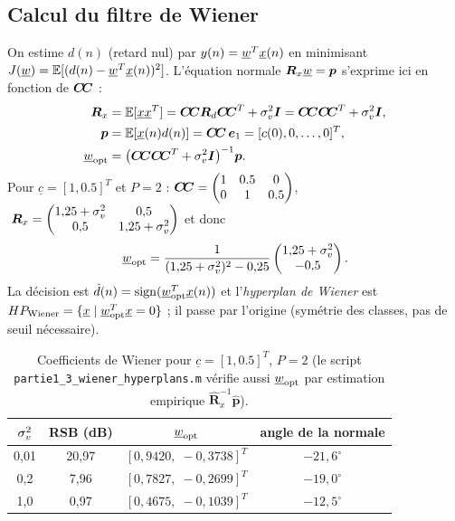 \subsection{Calcul du filtre de Wiener}
On estime $d(n)$ (retard nul) par $y(n)=\underline{w}^T\underline{x}(n)$ en minimisant $J(\underline{w})=\mathbb{E}[(d(n)-\underline{w}^T\underline{x}(n))^2]$. L'équation normale $\boldsymbol{R}_{x}\underline{w}=\boldsymbol{p}$ s'exprime ici en fonction de $\boldsymbol{C\!C}$ :
\begin{align}
 \boldsymbol{R}_{x}&=\mathbb{E}[\underline{x}\underline{x}^T]=\boldsymbol{C\!C}\boldsymbol{R}_d\boldsymbol{C\!C}^T+\sigma_v^2\boldsymbol{I}=\boldsymbol{C\!C}\boldsymbol{C\!C}^T+\sigma_v^2\boldsymbol{I},\\
 \boldsymbol{p}&=\mathbb{E}[\underline{x}(n)d(n)]=\boldsymbol{C\!C}\,\boldsymbol{e}_1=[c(0),0,\dots,0]^T,\\
 \underline{w}_{\rm opt}&=\big(\boldsymbol{C\!C}\boldsymbol{C\!C}^T+\sigma_v^2\boldsymbol{I}\big)^{-1}\boldsymbol{p} .
\end{align}
Pour $\underline c=[1,0.5]^T$ et $P=2$ :
$\boldsymbol{C\!C}=\begin{pmatrix}1&0.5&0\\0&1&0.5\end{pmatrix}$, $\;\boldsymbol{R}_{x}=\begin{pmatrix}1{,}25+\sigma_v^2&0{,}5\\0{,}5&1{,}25+\sigma_v^2\end{pmatrix}$ et donc
\begin{equation}
 \underline{w}_{\rm opt}=\frac{1}{(1{,}25+\sigma_v^2)^2-0{,}25}\begin{pmatrix}1{,}25+\sigma_v^2\\-0{,}5\end{pmatrix}.
\end{equation}
La décision est $\hat d(n)=\operatorname{sign}(\underline{w}_{\rm opt}^T\underline{x}(n))$ et l'\emph{hyperplan de Wiener} est $HP_{\rm Wiener}=\{\underline{x}\;|\;\underline{w}_{\rm opt}^T\underline{x}=0\}$ ; il passe par l'origine (symétrie des classes, pas de seuil nécessaire).

\begin{table}[H]\centering
\begin{tabular}{cccc}\toprule
$\sigma_v^2$ & RSB (dB) & $\underline{w}_{\rm opt}$ & angle de la normale\\\midrule
0,01 & 20,97 & $[0{,}9420,\;-0{,}3738]^T$ & $-21{,}6^\circ$\\
0,2  & 7,96 & $[0{,}7827,\;-0{,}2699]^T$ & $-19{,}0^\circ$\\
1,0  & 0,97 & $[0{,}4675,\;-0{,}1039]^T$ & $-12{,}5^\circ$\\\bottomrule
\end{tabular}
\caption{Coefficients de Wiener pour $\underline c=[1,0.5]^T$, $P=2$ (le script \texttt{partie1\_3\_wiener\_hyperplans.m} vérifie aussi $\underline{w}_{\rm opt}$ par estimation empirique $\hat{\bm R}_x^{-1}\hat{\bm p}$).}
\end{table}

